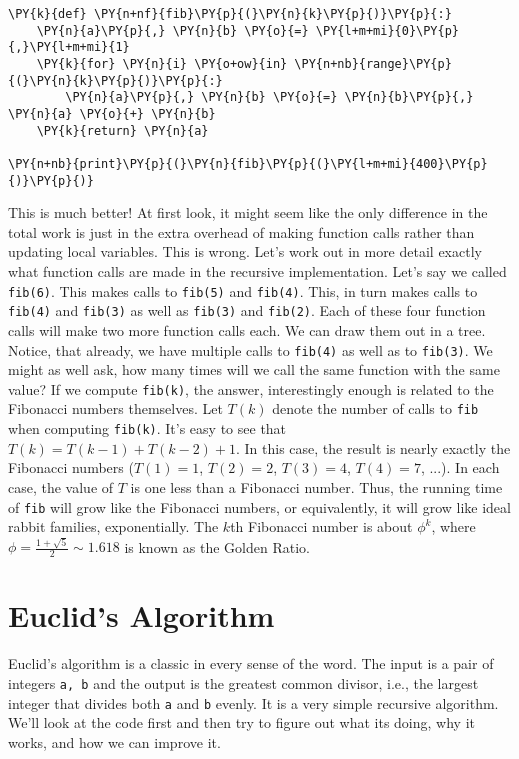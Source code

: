 \begin{Verbatim}[commandchars=\\\{\}]
\PY{k}{def} \PY{n+nf}{fib}\PY{p}{(}\PY{n}{k}\PY{p}{)}\PY{p}{:}
    \PY{n}{a}\PY{p}{,} \PY{n}{b} \PY{o}{=} \PY{l+m+mi}{0}\PY{p}{,}\PY{l+m+mi}{1}
    \PY{k}{for} \PY{n}{i} \PY{o+ow}{in} \PY{n+nb}{range}\PY{p}{(}\PY{n}{k}\PY{p}{)}\PY{p}{:}
        \PY{n}{a}\PY{p}{,} \PY{n}{b} \PY{o}{=} \PY{n}{b}\PY{p}{,} \PY{n}{a} \PY{o}{+} \PY{n}{b}
    \PY{k}{return} \PY{n}{a}

\PY{n+nb}{print}\PY{p}{(}\PY{n}{fib}\PY{p}{(}\PY{l+m+mi}{400}\PY{p}{)}\PY{p}{)}
\end{Verbatim}



This is much better!
At first look, it might seem like the only difference in the total work is just in the extra overhead of making function calls rather than updating local variables.
This is wrong.
Let's work out in more detail exactly what function calls are made in the recursive implementation.
Let's say we called \texttt{fib(6)}.
This makes calls to \texttt{fib(5)} and \texttt{fib(4)}.
This, in turn makes calls to \texttt{fib(4)} and \texttt{fib(3)} as well as \texttt{fib(3)} and \texttt{fib(2)}.
Each of these four function calls will make two more function calls each.
We can draw them out in a tree.
Notice, that already, we have multiple calls to \texttt{fib(4)} as well as to \texttt{fib(3)}.
We might as well ask, how many times will we call the same function with the same value?
If we compute \texttt{fib(k)}, the answer, interestingly enough is related to the Fibonacci numbers themselves.
Let $T(k)$ denote the number of calls to \texttt{fib} when computing \texttt{fib(k)}.
It's easy to see that $T(k) = T(k-1) + T(k-2) + 1$.
In this case, the result is nearly exactly the Fibonacci numbers ($T(1) = 1$, $T(2) = 2$, $T(3) = 4$, $T(4) = 7$, ...).  In each case, the value of $T$ is one less than a Fibonacci number.  Thus, the running time of \texttt{fib} will grow like the Fibonacci numbers, or equivalently, it will grow like ideal rabbit families, exponentially.  The $k$th Fibonacci number is about $\phi^k$, where $\phi = \frac{1+\sqrt{5}}{2}\sim1.618$ is known as the Golden Ratio.

\section{Euclid's Algorithm}


Euclid's algorithm is a classic in every sense of the word.
The input is a pair of integers \texttt{a, b} and the output is the greatest common divisor, i.e., the largest integer that divides both \texttt{a} and \texttt{b} evenly.
It is a very simple recursive algorithm.
We'll look at the code first and then try to figure out what its doing, why it works, and how we can improve it.

